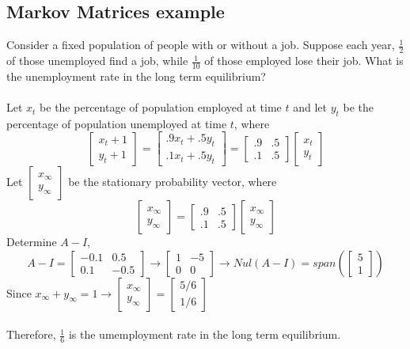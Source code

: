 \begin{enumerate}
\subsection{Markov Matrices example}
Consider a fixed population of people with or without a job. Suppose 
each year, $\frac{1}{2}$ of those unemployed find a job, while 
$\frac{1}{10}$ of those employed lose their job. What is the 
unemployment rate in the long term equilibrium? \\\\
Let $x_t$ be the percentage of population employed at time $t$ and
let $y_t$ be the percentage of population unemployed at time $t$, 
where 
\[
  \begin{bmatrix} x_t + 1 \\ y_t + 1 \end{bmatrix} = \begin{bmatrix}
  .9x_t + .5y_t \\ .1x_t + .5y_t \end{bmatrix} = \begin{bmatrix}
  .9 & .5 \\ .1 & .5 \end{bmatrix} \begin{bmatrix} x_t \\ y_t \end{bmatrix}
\]
Let $\begin{bmatrix} x_\infty \\ y_\infty \end{bmatrix}$ be the 
stationary probability vector, where 
\[
  \begin{bmatrix} x_\infty \\ y_\infty \end{bmatrix} = 
  \begin{bmatrix} .9 & .5 \\ .1 & .5 \end{bmatrix} 
  \begin{bmatrix} x_\infty \\ y_\infty \end{bmatrix}
\]
Determine $A - I$, 
\[
  A - I = \begin{bmatrix} -0.1 & 0.5 \\ 0.1 & -0.5 \end{bmatrix}
  \rightarrow \begin{bmatrix} 1 & -5 \\ 0 & 0 \end{bmatrix}
  \rightarrow Nul(A - I) = span(\begin{bmatrix} 5 \\ 1 \end{bmatrix})
\]
Since $x_\infty + y_\infty = 1 \rightarrow \begin{bmatrix} x_\infty \\
  y_\infty \end{bmatrix} = \begin{bmatrix} 5/6 \\ 1/6 \end{bmatrix}$ \\\\
  Therefore, $\frac{1}{6}$ is the umemployment rate in the long term equilibrium. 

\end{enumerate}
